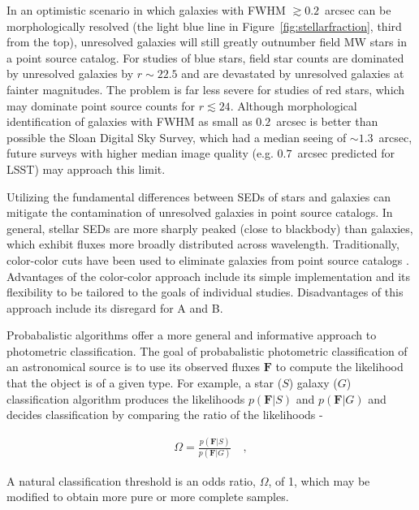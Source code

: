 \documentclass[12pt,preprint]{aastex}
\newcommand{\datavector}[1]{\boldsymbol{#1}}
\begin{document}
In an optimistic scenario in which galaxies with FWHM $\gtrsim 0.2$~arcsec can
be morphologically resolved (the light blue line in
Figure~\ref{fig:stellarfraction}, third from the top), unresolved
galaxies will still greatly outnumber field MW stars in a point source
catalog.  For studies of blue stars, field star counts are dominated
by unresolved galaxies by $r\sim22.5$ and are devastated by unresolved
galaxies at fainter magnitudes. The problem is far less severe for
studies of red stars, which may dominate point source counts for
$r\lesssim24$. Although morphological identification of galaxies with
FWHM as small as $0.2$~arcsec is better than possible the Sloan Digital Sky
Survey, which had a median seeing of $\sim1.3$~arcsec, future surveys with
higher median image quality (e.g. $0.7$~arcsec predicted for LSST) may
approach this limit.

Utilizing the fundamental differences between SEDs of stars and
galaxies can mitigate the contamination of unresolved galaxies in
point source catalogs.  In general, stellar SEDs are more sharply
peaked (close to blackbody) than galaxies, which exhibit fluxes more
broadly distributed across wavelength.  Traditionally, color-color
cuts have been used to eliminate galaxies from point source catalogs
\citep[e.g.][]{gould92a,reitzel98a,daddi04a}.  Advantages of the
color-color approach include its simple implementation and its
flexibility to be tailored to the goals of individual studies.
Disadvantages of this approach include its disregard for A and B.

Probabalistic algorithms offer a more general and informative approach
to photometric classification.  The goal of probabalistic photometric
classification of an astronomical source is to use its observed fluxes
$\datavector{F}$ to compute the likelihood that the object is of a
given type.  For example, a star ($S$) galaxy ($G$) classification
algorithm produces the likelihoods $p(\datavector{F}|S)$ and
$p(\datavector{F}|G)$ and decides classification by comparing the
ratio of the likelihoods -

\begin{eqnarray}\displaystyle
\Omega = \frac{p(\datavector{F}|S)}{p(\datavector{F}|G)} 
\quad ,
\label{eqn:oddsratio}
\end{eqnarray}

\noindent A natural classification threshold is an odds ratio,
$\Omega$, of 1, which may be modified to obtain more pure or more
complete samples.
\end{document}
